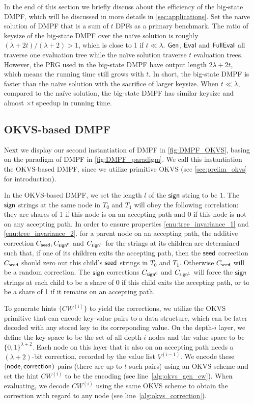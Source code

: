 In the end of this section we briefly discuss about the efficiency of the big-state DMPF, which will be discussed in more details in \cref{sec:applications}. Set the na\"ive solution of DMPF that is a sum of $t$ DPFs as a primary benchmark. The ratio of keysize of the big-state DMPF over the na\"ive solution is roughly $(\lambda+2t)/(\lambda+2)>1$, which is close to 1 if $t\ll \lambda$. ${\sf Gen}$, ${\sf Eval}$ and ${\sf FullEval}$ all traverse one evaluation tree while the na\"ive solution traverse $t$ evaluation trees. However, the PRG used in the big-state DMPF have output length $2\lambda+2t$, which means the running time still grows with $t$. In short, the big-state DMPF is faster than the na\"ive solution with the sacrifice of larger keysize. When $t\ll\lambda$, compared to the na\"ive solution, the big-state DMPF has similar keysize and almost $\times t$ speedup in running time. 

\subsection{OKVS-based DMPF}\label{sec:OKVS_based_DMPF}
Next we display our second instantiation of DMPF in \cref{fig:DMPF_OKVS}, basing on the paradigm of DMPF in \cref{fig:DMPF_paradigm}. We call this instantiation the OKVS-based DMPF, since we utilize primitive OKVS (see \cref{sec:prelim_okvs} for introduction). 

In the OKVS-based DMPF, we set the length $l$ of the ${\sf sign}$ string to be $1$. The ${\sf sign}$ strings at the same node in $T_0$ and $T_1$ will obey the following correlation: they are shares of 1 if this node is on an accepting path and 0 if this node is not on any accepting path. In order to ensure properties \ref{enu:tree_invariance_1} and \ref{enu:tree_invariance_2}, for a parent node on an accepting path, the additive correction $C_{\sf seed}, C_{{\sf sign}^0}$ and $C_{{\sf sign}^1}$ for the strings at its children are determined such that, if one of its children exits the accepting path, then the ${\sf seed}$ correction $C_{\sf seed}$ should zero out this child's ${\sf seed}$ strings in $T_0$ and $T_1$. Otherwise $C_{\sf seed}$ will be a random correction. The ${\sf sign}$ corrections $C_{{\sf sign}^0}$ and $C_{{\sf sign}^1}$ will force the ${\sf sign}$ strings at each child to be a share of 0 if this child exits the accepting path, or to be a share of 1 if it remains on an accepting path.  

To generate hints $\{CW^{(i)}\}$ to yield the corrections, we utilize the OKVS primitive that can encode key-value pairs to a data structure, which can be later decoded with any stored key to its correponding value. On the depth-$i$ layer, we define the key space to be the set of all depth-$i$ nodes and the value space to be $\{0,1\}^{\lambda+2}$. Each node on this layer that is also on an accepting path needs a $(\lambda+2)$-bit correction, recorded by the value list $V^{(i-1)}$. We encode these $\sf (node,correction)$ pairs (there are up to $t$ such pairs) using an OKVS scheme and set the hint $CW^{(i)}$ to be the encoding (see line~\ref{alg:okvs_gen_cw}). When evaluating, we decode $CW^{(i)}$ using the same OKVS scheme to obtain the correction with regard to any node (see line~\ref{alg:okvs_correction}). 

